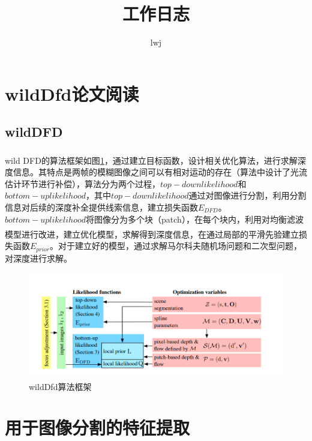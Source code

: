 \documentclass[UTF8]{ctexart}
\title{工作日志}
\author{lwj}
\newcommand{\myciteup}[1]{\textsuperscript{\textsuperscript{\cite{#1}}}}
\begin{document}
    \begin{sloppypar}
        \maketitle
        \newpage
        \tableofcontents
        \newpage
        \section{wildDfd论文阅读}
        \subsection{wildDFD}
        wild DFD\myciteup{2017Depth}的算法框架如图\ref{fig:wild:framework}，通过建立目标函数，设计相关优化算法，进行求解深度信息。其特点是两帧的模糊图像之间可以有相对运动的存在（算法中设计了光流估计环节进行补偿），算法分为两个过程，$top-down likelihood$和$bottom-up likelihood$，其中$top-down likelihood$通过对图像进行分割，利用分割信息对后续的深度补全提供线索信息，建立损失函数$E_{DFD}$。$bottom-up likelihood$将图像分为多个块（patch），在每个块内，利用对均衡滤波模型\myciteup{2006Depth}进行改进，建立优化模型，求解得到深度信息，在通过局部的平滑先验建立损失函数$E_{prior}$。对于建立好的模型，通过求解马尔科夫随机场问题和二次型问题，对深度进行求解。
        \begin{figure}[htbp]
            \centering
            \includegraphics[width=0.9\linewidth]{figure/wildDfdFramework}
            \caption{\small wildDfd算法框架\myciteup{2017Depth}}
            \label{fig:wild:framework}
        \end{figure}
        \section{用于图像分割的特征提取}

\end{sloppypar}
\end{document}
